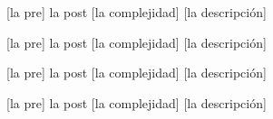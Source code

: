 \begin{Interfaz}
    [la pre]
    {la post}
    [la complejidad]
    [la descripción]
    
    [la pre]
    {la post}
    [la complejidad]
    [la descripción]
    
    [la pre]
    {la post}
    [la complejidad]
    [la descripción]
    
    [la pre]
    {la post}
    [la complejidad]
    [la descripción]

\end{Interfaz}